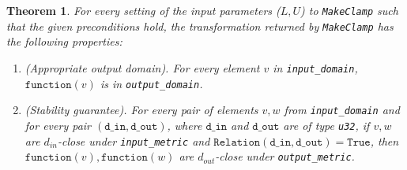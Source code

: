 \documentclass[11pt,a4paper]{article}
\newtheorem{theorem}{Theorem}
\theoremstyle{definition}
\newcommand{\din}{\texttt{d\_in}}
\newcommand{\dout}{\texttt{d\_out}}
\newcommand{\Relation}{\texttt{Relation}}
\newcommand{\True}{\texttt{True}}
\newcommand{\function}{\texttt{function}}
\newcommand{\silvia}[1]{{ {\color{blue}{(silvia)~#1}}}}
\begin{document}
\begin{theorem}
    For every setting of the input parameters ($L, U$) to \texttt{MakeClamp} such that the given preconditions
    hold, the transformation returned by \texttt{MakeClamp} has the following properties:
    \begin{enumerate}
        \item \textup{(Appropriate output domain).} For every element $v$ in \texttt{input\_domain}, $\function(v)$ is in \texttt{output\_domain}. %
        \item \textup{(Stability guarantee).} For every pair of elements $v, w$ from \texttt{input\_domain} and for every pair $(\din, \dout)$, where $\din$ and $\dout$ are of type \texttt{u32}, if $v,w$ are $d_{in}$-close under \texttt{input\_metric} and $\Relation(\din, \dout) = \True$, then $\function(v), \function(w)$ are $d_{out}$-close under \texttt{output\_metric}.
    \end{enumerate}
\end{theorem}
\end{document}
